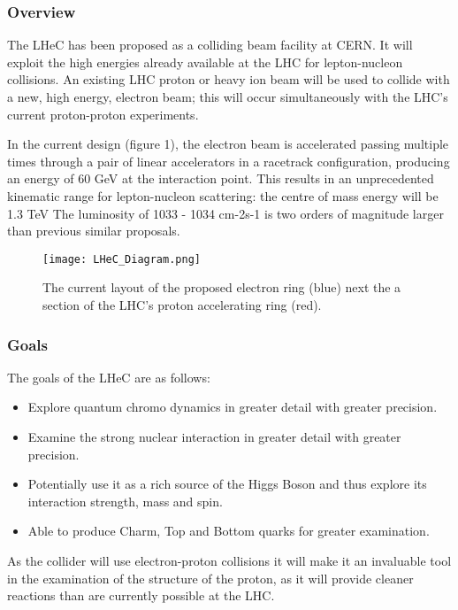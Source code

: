 \subsubsection{Overview \cite{LHeC:Birmingham}}

The LHeC has been proposed as a colliding beam facility at CERN. It will exploit the high energies already available at the LHC for lepton-nucleon collisions. An existing LHC proton or heavy ion beam will be used to collide with a new, high energy, electron beam; this will occur simultaneously with the LHC’s current proton-proton experiments.
 
In the current design (figure 1), the electron beam is accelerated passing multiple times through a pair of linear accelerators in a racetrack configuration, producing an energy of 60 GeV at the interaction point. This results in an unprecedented kinematic range for lepton-nucleon scattering: the centre of mass energy will be 1.3 TeV The luminosity of 1033 - 1034 cm-2s-1 is two orders of magnitude larger than previous similar proposals.

\begin{figure}
\centering
\texttt{[image: LHeC\_Diagram.png]}
\caption{The current layout of the proposed electron ring (blue) next the a section of the LHC’s proton accelerating ring (red).
}
\end{figure}

\subsubsection{Goals}

The goals of the LHeC are as follows:
\begin{itemize}
\item Explore quantum chromo dynamics in greater detail with greater precision.
\item Examine the strong nuclear interaction in greater detail with greater precision.
\item Potentially use it as a rich source of the Higgs Boson and thus explore its interaction strength, mass and spin.
\item Able to produce Charm, Top and Bottom quarks for greater examination.
\end{itemize}
As the collider will use electron-proton collisions it will make it an invaluable tool in the examination of the structure of the proton, as it will provide cleaner reactions than are currently possible at the LHC.
 
